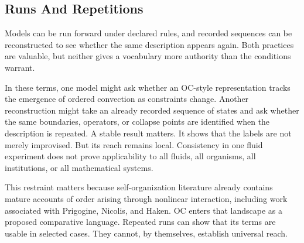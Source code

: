 \documentclass[11pt,a4paper,openany]{book}
\begin{document}
\subsection{Runs And Repetitions}
Models can be run forward under declared rules, and recorded sequences can be reconstructed to see whether the same description appears again. Both practices are valuable, but neither gives a vocabulary more authority than the conditions warrant. \cite{prigogine_dissipative,haken_synergetics}\par
In these terms, one model might ask whether an OC-style representation tracks the emergence of ordered convection as constraints change. Another reconstruction might take an already recorded sequence of states and ask whether the same boundaries, operators, or collapse points are identified when the description is repeated. A stable result matters. It shows that the labels are not merely improvised. But its reach remains local. Consistency in one fluid experiment does not prove applicability to all fluids, all organisms, all institutions, or all mathematical systems.\par
This restraint matters because self-organization literature already contains mature accounts of order arising through nonlinear interaction, including work associated with Prigogine, Nicolis, and Haken. OC enters that landscape as a proposed comparative language. Repeated runs can show that its terms are usable in selected cases. They cannot, by themselves, establish universal reach.\par
\end{document}

